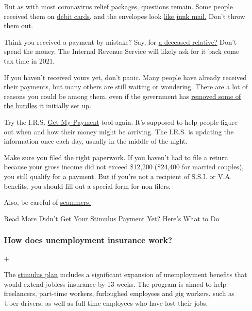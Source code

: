 But as with most coronavirus relief packages, questions remain. Some
people received them on
\href{https://www.washingtonpost.com/business/2020/06/01/faq-stimulus-debit-card/}{debit
cards,} and the envelopes look
\href{https://twitter.com/zackstanton/status/1263908922899009536}{like
junk mail.} Don't throw them out.

Think you received a payment by mistake? Say, for
\href{https://www.nytimes3xbfgragh.onion/2020/06/25/us/politics/coronavirus-stimulus-dead-people.html}{a
deceased relative?} Don't spend the money. The Internal Revenue Service
will likely ask for it back come tax time in 2021.

If you haven't received yours yet, don't panic. Many people have already
received their payments, but many others are still waiting or wondering.
There are a lot of reasons you could be among them, even if the
government has
\href{https://www.nytimes3xbfgragh.onion/2020/04/01/business/coronavirus-stimulus-social-security.html}{removed
some of the hurdles} it initially set up.

Try the I.R.S. \href{https://www.irs.gov/coronavirus/get-my-payment}{Get
My Payment} tool again. It's supposed to help people figure out when and
how their money might be arriving. The I.R.S. is updating the
information once each day, usually in the middle of the night.

Make sure you filed the right paperwork. If you haven't had to file a
return because your gross income did not exceed \$12,200 (\$24,400 for
married couples), you still qualify for a payment. But if you're not a
recipient of S.S.I. or V.A. benefits, you should fill out a special form
for non-filers.

Also, be careful of
\href{https://www.nytimes3xbfgragh.onion/2020/04/22/technology/stimulus-checks-hackers-coronavirus.html}{scammers.}

Read More
\href{https://www.nytimes3xbfgragh.onion/article/where-is-my-stimulus-payment.html}{Didn't
Get Your Stimulus Payment Yet? Here's What to Do}

\hypertarget{how-does-unemployment-insurance-work}{%
\subsubsection{How does unemployment insurance
work?}\label{how-does-unemployment-insurance-work}}

+

The
\href{https://www.nytimes3xbfgragh.onion/2020/03/25/us/politics/whats-in-coronavirus-stimulus-bill.html}{stimulus
plan} includes a significant expansion of unemployment benefits that
would extend jobless insurance by 13 weeks. The program is aimed to help
freelancers, part-time workers, furloughed employees and gig workers,
such as Uber drivers, as well as full-time employees who have lost their
jobs.


